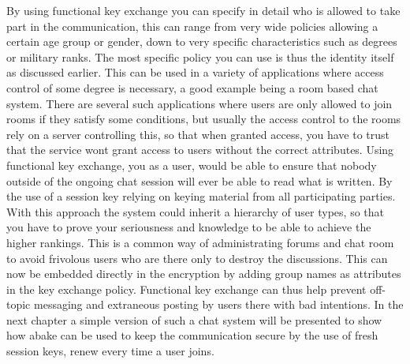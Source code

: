 \par By using functional key exchange you can specify in detail who is allowed to take part in the communication, this can range from very wide policies allowing a certain age group or gender, down to very specific characteristics such as degrees or military ranks. The most specific policy you can use is thus the identity itself as discussed earlier. This can be used in a variety of applications where access control of some degree is necessary, a good example being a room based chat system. There are several such applications where users are only allowed to join rooms if they satisfy some conditions, but usually the access control to the rooms rely on a server controlling this, so that when granted access, you have to trust that the service wont grant access to users without the correct attributes. Using functional key exchange, you as a user, would be able to ensure that nobody outside of the ongoing chat session will ever be able to read what is written. By the use of a session key relying on keying material from all participating parties. With this approach the system could inherit a hierarchy of user types, so that you have to prove your seriousness and knowledge to be able to achieve the higher rankings. This is a common way of administrating forums and chat room to avoid frivolous users who are there only to destroy the discussions. This can now be embedded directly in the encryption by adding group names as attributes in the key exchange policy. Functional key exchange can thus help prevent off-topic messaging and extraneous posting by users there with bad intentions.
In the next chapter a simple version of such a chat system will be presented to show how \gls{abake} can be used to keep the communication secure by the use of fresh session keys, renew every time a user joins. 
